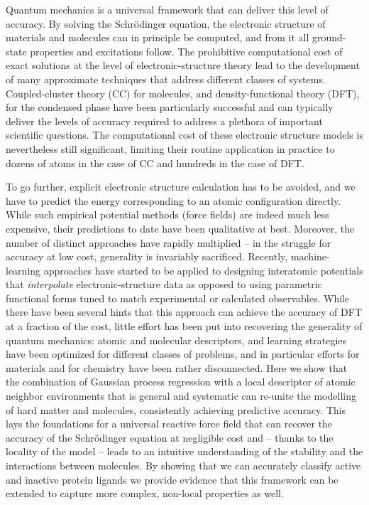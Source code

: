 \documentclass[12pt]{article}
\begin{document}
Quantum mechanics is a universal framework that can deliver this level of accuracy. By solving the Schr\"odinger equation, the electronic structure of materials and molecules can
in principle be computed, and from it all 
ground-state properties and excitations follow. 
The prohibitive computational cost of exact solutions 
at the level of electronic-structure theory lead to the development of many approximate techniques that address different classes of systems. Coupled-cluster theory (CC)\cite{SzaboOstlund} for molecules, and density-functional theory (DFT)\cite{RichardMartinDFT,DFT-HK,DFT-KS}, for the condensed phase have been particularly successful and can typically deliver the levels of accuracy required to address a plethora of important scientific questions. 
The computational cost of these electronic structure models is nevertheless still significant, limiting their routine application in practice to dozens of atoms in the case of CC and hundreds in the case of DFT. 

To go further, explicit electronic structure calculation
has to be avoided, and we have to predict the energy corresponding to an atomic configuration directly. While such empirical potential methods (force fields) are indeed much less expensive, their predictions to date have been qualitative at best. 
Moreover, the number of distinct approaches have rapidly multiplied -- in the struggle for accuracy at low cost, generality is invariably sacrificed. Recently,  machine-learning approaches have started to be applied
to designing interatomic potentials  that {\em interpolate}
electronic-structure data as opposed to using parametric functional forms tuned to match experimental or calculated observables.
While there have been several
hints that this approach can achieve the
accuracy of DFT at a fraction of the
cost\cite{behl-parr07prl,bart+10prl,snyd+12prl,mont+13njp,fabe+16prl,shap16mms,ANI1}, little effort has been put into recovering the generality of quantum mechanics: atomic and molecular descriptors, and 
learning strategies have been optimized
for different classes of problems, and in particular efforts for materials and for chemistry have been rather disconnected. 
Here we show that the combination of Gaussian process regression\cite{RasmussenBook} with a local 
descriptor of atomic neighbor environments that is 
general and systematic can re-unite the 
modelling of hard matter and molecules, consistently achieving 
predictive accuracy. 
{
This lays the foundations for a 
universal reactive force field that can recover the accuracy of the Schr\"odinger equation at negligible cost and -- thanks to the locality of the model -- leads to an intuitive understanding of the stability and the interactions between molecules. 
By showing that we can accurately classify active and inactive protein ligands we provide evidence that this framework can be extended to capture more complex, non-local properties as  well.}
\end{document}
